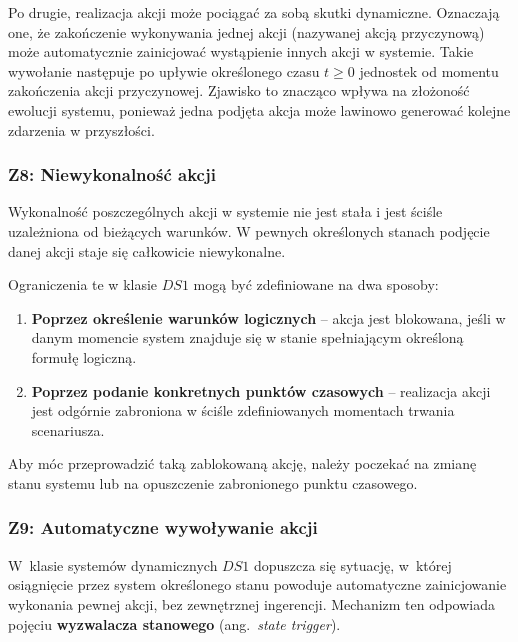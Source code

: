 \documentclass[12pt,a4paper]{article}
\begin{document}
Po drugie, realizacja akcji może pociągać za sobą skutki dynamiczne. Oznaczają one, że zakończenie wykonywania jednej akcji (nazywanej akcją przyczynową) może automatycznie zainicjować wystąpienie innych akcji w systemie. Takie wywołanie następuje po upływie określonego czasu $t \ge 0$ jednostek od momentu zakończenia akcji przyczynowej. Zjawisko to znacząco wpływa na złożoność ewolucji systemu, ponieważ jedna podjęta akcja może lawinowo generować kolejne zdarzenia w przyszłości.

\subsubsection*{Z8: Niewykonalność akcji}

Wykonalność poszczególnych akcji w systemie nie jest stała i jest ściśle uzależniona od bieżących warunków. W pewnych określonych stanach podjęcie danej akcji staje się całkowicie niewykonalne. 

Ograniczenia te w klasie $DS1$ mogą być zdefiniowane na dwa sposoby:
\begin{enumerate}[label=\arabic*.]
    \item \textbf{Poprzez określenie warunków logicznych} -- akcja jest blokowana, jeśli w danym momencie system znajduje się w stanie spełniającym określoną formułę logiczną.
    \item \textbf{Poprzez podanie konkretnych punktów czasowych} -- realizacja akcji jest odgórnie zabroniona w ściśle zdefiniowanych momentach trwania scenariusza.
\end{enumerate}
Aby móc przeprowadzić taką zablokowaną akcję, należy poczekać na zmianę stanu systemu lub na opuszczenie zabronionego punktu czasowego.

\subsubsection*{Z9: Automatyczne wywoływanie akcji}
 
W~klasie systemów dynamicznych $DS1$ dopuszcza się sytuację, w~której osiągnięcie przez system określonego stanu powoduje automatyczne zainicjowanie wykonania pewnej akcji, bez zewnętrznej ingerencji. Mechanizm ten odpowiada pojęciu \textbf{wyzwalacza stanowego} (ang.~\emph{state trigger}).
 
\end{document}
